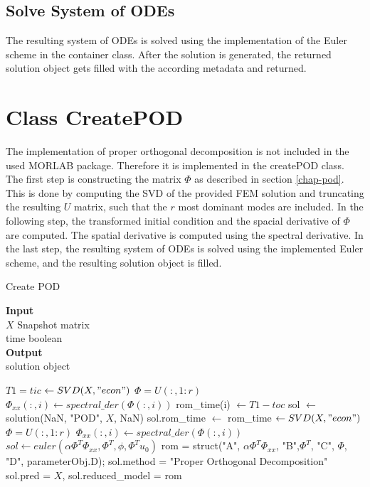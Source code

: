 \subsection{Solve System of ODEs}
The resulting system of ODEs is solved using the implementation of the Euler scheme in the container class.
After the solution is generated, the returned solution object gets filled with the according metadata and returned.

\section{Class CreatePOD}
The implementation of proper orthogonal decomposition is not included in the used MORLAB package.
Therefore it is implemented in the createPOD class.
The first step is constructing the matrix \(\Phi\) as described in section \ref{chap-pod}.
This is done by computing the SVD of the provided FEM solution and truncating the resulting \(U\) matrix, such that the \(r\) most dominant modes are included.
In the following step, the transformed initial condition and the spacial derivative of \(\Phi\) are computed.
The spatial derivative is computed using the spectral derivative.
In the last step, the resulting system of ODEs is solved using the implemented Euler scheme, and the resulting solution object is filled.
\begin{algorithm}[H]
\caption{Create POD}
\textbf{Input} \\
\hspace*{\algorithmicindent} $X$ Snapshot matrix \\
\hspace*{\algorithmicindent} time boolean \\
\textbf{Output} \\
\hspace*{\algorithmicindent} solution object
\begin{algorithmic}[1]
\State $T1 = tic$
\State [$U$, $S$, $V$] $\gets SVD(X, "econ")$
\State $\Phi = U(:, 1:r)$
\State $\Phi_{xx}(:, i) \gets spectral\_der(\Phi(:, i))$
\State rom\_time(i) $\gets T1 - toc$
\EndFor
\EndFor
\State sol $\gets$ solution(NaN, "POD", $X$, NaN)
\State sol.rom\_time $\gets$ rom\_time
\EndIf
\State [$U$, $S$, $V$] $\gets SVD(X, "econ")$
\State $\Phi = U(:, 1:r)$
\State $\Phi_{xx}(:, i) \gets spectral\_der(\Phi(:, i))$
\EndFor
\State $sol \gets euler(\alpha \Phi^{T} \Phi_{xx}, \Phi^{T}, \phi, \Phi^{T} u_0)$
\State rom = struct("A", $\alpha \Phi^{T} \Phi_{xx}$, "B",$\Phi^{T}$, "C", $\Phi$, "D", parameterObj.D);
\State sol.method = "Proper Orthogonal Decomposition"
\State sol.pred = $X$, sol.reduced\_model = rom
\EndProcedure
\end{algorithmic}
\end{algorithm}
